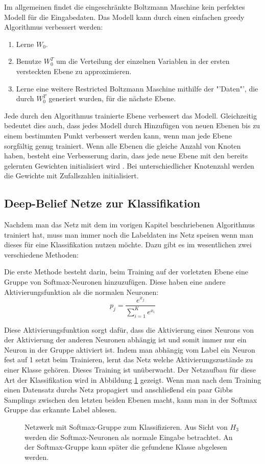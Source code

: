 \documentclass[12pt]{article}
\begin{document}
Im allgemeinen findet die eingeschränkte Boltzmann Maschine kein perfektes Modell für die Eingabedaten. Das Modell kann durch einen einfachen greedy Algorithmus verbessert werden:
 
\begin{enumerate}
\item Lerne $W_0$.
\item Benutze $W_0^T$ um die Verteilung der einzelnen Variablen in der ersten versteckten Ebene zu approximieren.
\item Lerne eine weitere Restricted Boltzmann Maschine  mithilfe der "'Daten"', die durch $W_0^T$ generiert wurden, für die nächste Ebene.
\end{enumerate}



Jede durch den Algorithmus trainierte Ebene verbessert das Modell. Gleichzeitig bedeutet dies auch, dass jedes Modell durch Hinzufügen von neuen Ebenen bis zu einem bestimmten Punkt verbessert werden kann, wenn man jede Ebene sorgfältig genug trainiert. Wenn alle Ebenen die gleiche Anzahl von Knoten haben, besteht eine Verbesserung darin, dass jede neue Ebene mit den bereits gelernten Gewichten initialisiert wird \cite{learning}. Bei unterschiedlicher Knotenzahl werden die Gewichte mit Zufallszahlen initialisiert.

\subsection{Deep-Belief Netze zur Klassifikation}
Nachdem man das Netz mit dem im vorigen Kapitel beschriebenen Algorithmus trainiert hat, muss man immer noch die Labeldaten ins Netz speisen wenn man dieses für eine Klassifikation nutzen möchte. Dazu gibt es im wesentlichen zwei verschiedene Methoden:

Die erste Methode besteht darin, beim Training auf der vorletzten Ebene eine Gruppe von Softmax-Neuronen hinzuzufügen. Diese haben eine andere Aktivierungsfunktion als die normalen Neuronen: 
\begin{equation}
p_j = \frac{e^{x_j}}{\sum_{i=1}^K e^{x_i}}
\end{equation}

Diese Aktivierungsfunktion sorgt dafür, dass die Aktivierung eines Neurons von der Aktivierung der anderen Neuronen abhängig ist und somit immer nur ein Neuron in der Gruppe aktiviert ist. Indem man abhängig vom Label ein Neuron fest auf 1 setzt beim Trainieren, lernt das Netz welche Aktivierungszustände zu einer Klasse gehören. Dieses Training ist unüberwacht. Der Netzaufbau für diese Art der Klassifikation wird in Abbildung \ref{SMTrain} gezeigt. Wenn man nach dem Training einen Datensatz durchs Netz propagiert und anschließend ein paar Gibbs Samplings zwischen den letzten beiden Ebenen macht, kann man in der Softmax Gruppe das erkannte Label ablesen.
\begin{figure}[H]
	\center
	
	\caption{Netzwerk mit Softmax-Gruppe zum Klassifizieren. Aus Sicht von $H_3$ werden die Softmax-Neuronen als normale Eingabe betrachtet. An der Softmax-Gruppe kann später die gefundene Klasse abgelesen werden.}
	\label{SMTrain}
\end{figure}
\end{document}
